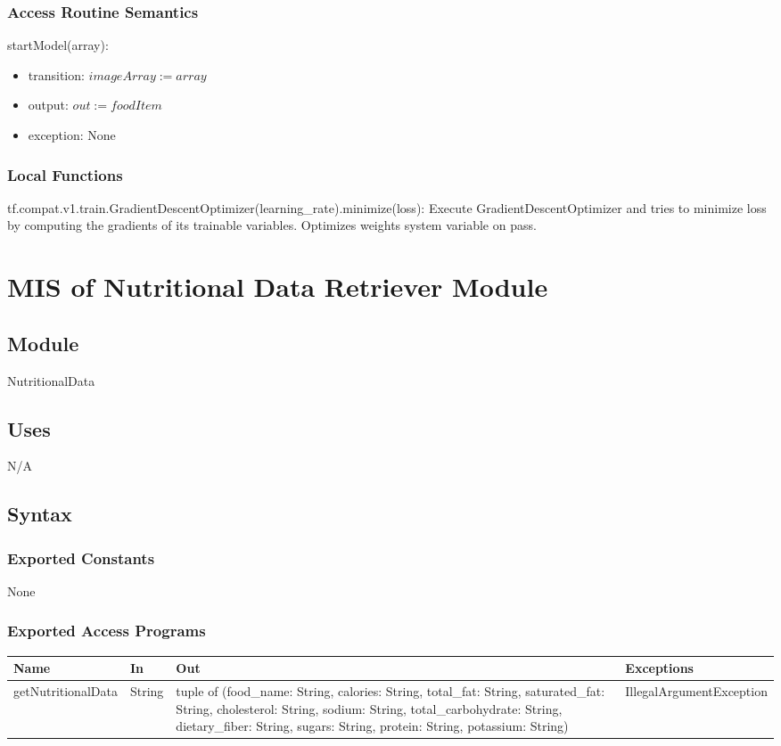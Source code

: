 \documentclass[12pt, titlepage]{article}
\begin{document}
\subsubsection{Access Routine Semantics}
\noindent startModel(array):
\begin{itemize}
	\item transition: $imageArray := array$
	\item output: $out := foodItem$
	\item exception: None
\end{itemize}
\subsubsection{Local Functions}
tf.compat.v1.train.GradientDescentOptimizer(learning\_rate).minimize(loss): Execute GradientDescentOptimizer and tries to minimize loss by computing the gradients of its trainable variables. Optimizes weights system variable on pass.

\newpage

\section{MIS of Nutritional Data Retriever Module} \label{NDR}
\subsection{Module}
NutritionalData
\subsection{Uses}
N/A
\subsection{Syntax}
\subsubsection{Exported Constants}
None
\subsubsection{Exported Access Programs}
\begin{center}
	\begin{tabular}{p{4cm} p{2cm} p{5cm} p{4.5cm}}
		\hline
		\textbf{Name} & \textbf{In} & \textbf{Out} & \textbf{Exceptions} \\
		\hline
		getNutritionalData & String & tuple of (food\_name: String, calories: String, total\_fat: String, saturated\_fat: String, cholesterol: String, sodium: String, total\_carbohydrate: String, dietary\_fiber: String, sugars: String, protein: String, potassium: String) & IllegalArgumentException \\
		\hline
	\end{tabular}
\end{center}
\end{document}
